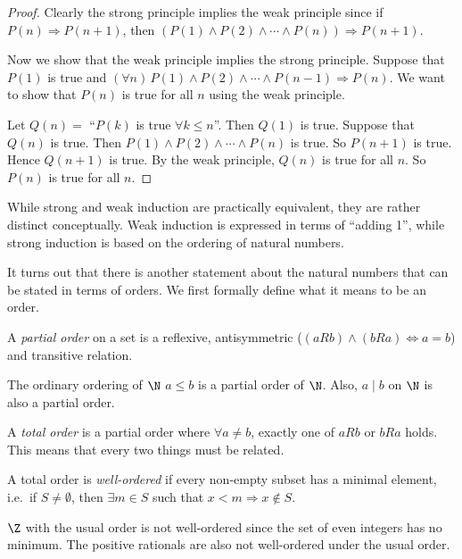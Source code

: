 \documentclass[a4paper]{article}
\begin{document}
\begin{proof}
  Clearly the strong principle implies the weak principle since if $P(n)\Rightarrow P(n + 1)$, then $(P(1)\wedge P(2)\wedge \cdots \wedge P(n))\Rightarrow P(n + 1)$.

  Now we show that the weak principle implies the strong principle. Suppose that $P(1)$ is true and $(\forall n)\,P(1)\wedge P(2)\wedge \cdots \wedge P(n - 1)\Rightarrow P(n)$. We want to show that $P(n)$ is true for all $n$ using the weak principle.

  Let $Q(n) = $ ``$P(k)$ is true $\forall k\leq n$''. Then $Q(1)$ is true. Suppose that $Q(n)$ is true. Then $P(1)\wedge P(2)\wedge\cdots \wedge P(n)$ is true. So $P(n+1)$ is true. Hence $Q(n + 1)$ is true. By the weak principle, $Q(n)$ is true for all $n$. So $P(n)$ is true for all $n$.
\end{proof}
While strong and weak induction are practically equivalent, they are rather distinct conceptually. Weak induction is expressed in terms of ``adding 1'', while strong induction is based on the ordering of natural numbers.

It turns out that there is another statement about the natural numbers that can be stated in terms of orders. We first formally define what it means to be an order.

\begin{defi}
  A \emph{partial order} on a set is a reflexive, antisymmetric ($(aRb) \wedge (bRa) \Leftrightarrow a = b$) and transitive relation.
\end{defi}

\begin{eg}
  The ordinary ordering of $\N$ $a\leq b$ is a partial order of $\N$. Also, $a\mid b$ on $\N$ is also a partial order.
\end{eg}

\begin{defi}
  A \emph{total order} is a partial order where $\forall a\not= b$, exactly one of $aRb$ or $bRa$ holds. This means that every two things must be related.
\end{defi}

\begin{defi}
  A total order is \emph{well-ordered} if every non-empty subset has a minimal element, i.e.\ if $S\not= \emptyset$, then $\exists m\in S$ such that $x < m \Rightarrow x\not\in S$.
\end{defi}

\begin{eg}
  $\Z$ with the usual order is not well-ordered since the set of even integers has no minimum. The positive rationals are also not well-ordered under the usual order.
\end{eg}
\end{document}

